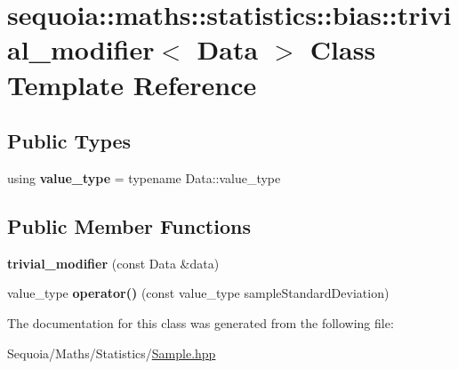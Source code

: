 \hypertarget{classsequoia_1_1maths_1_1statistics_1_1bias_1_1trivial__modifier}{}\section{sequoia\+::maths\+::statistics\+::bias\+::trivial\+\_\+modifier$<$ Data $>$ Class Template Reference}
\label{classsequoia_1_1maths_1_1statistics_1_1bias_1_1trivial__modifier}
\subsection*{Public Types}
\begin{DoxyCompactItemize}
\item 
\mbox{\label{classsequoia_1_1maths_1_1statistics_1_1bias_1_1trivial__modifier_a569a61197697d938e2bd17e55e372d4f}} 
using {\bfseries value\+\_\+type} = typename Data\+::value\+\_\+type
\end{DoxyCompactItemize}
\subsection*{Public Member Functions}
\begin{DoxyCompactItemize}
\item 
\mbox{\label{classsequoia_1_1maths_1_1statistics_1_1bias_1_1trivial__modifier_a971caa0038d47e4230911f8fc25728bb}} 
{\bfseries trivial\+\_\+modifier} (const Data \&data)
\item 
\mbox{\label{classsequoia_1_1maths_1_1statistics_1_1bias_1_1trivial__modifier_aa028f03687df68704dfab6a1350207fb}} 
value\+\_\+type {\bfseries operator()} (const value\+\_\+type sample\+Standard\+Deviation)
\end{DoxyCompactItemize}


The documentation for this class was generated from the following file\+:\begin{DoxyCompactItemize}
\item 
Sequoia/\+Maths/\+Statistics/\mbox{\hyperlink{_sample_8hpp}{Sample.\+hpp}}\end{DoxyCompactItemize}
